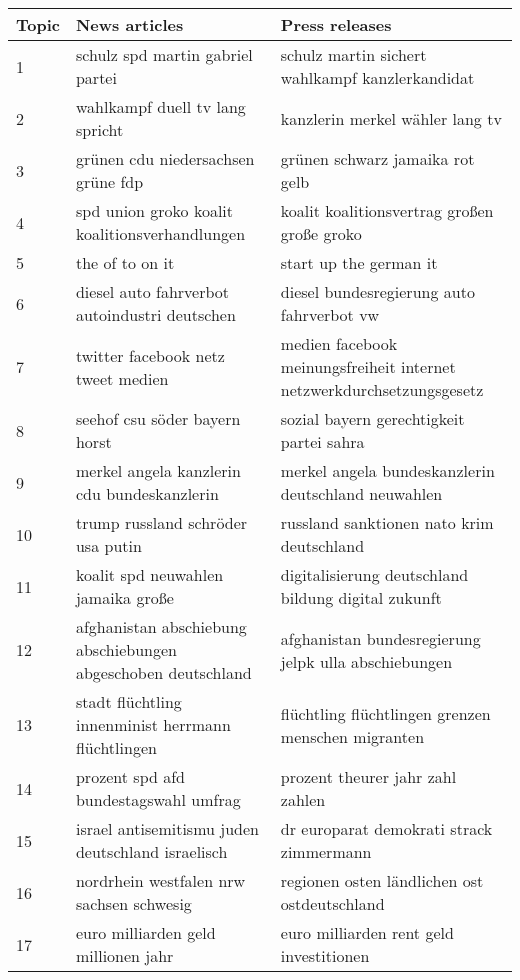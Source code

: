 \begin{table}[ht]
\centering
\begin{tabular}{lll}
  \hline
Topic & News articles & Press releases \\ 
  \hline
1 & schulz spd martin gabriel partei & schulz martin sichert wahlkampf kanzlerkandidat \\ 
  2 & wahlkampf duell tv lang spricht & kanzlerin merkel wähler lang tv \\ 
  3 & grünen cdu niedersachsen grüne fdp & grünen schwarz jamaika rot gelb \\ 
  4 & spd union groko koalit koalitionsverhandlungen & koalit koalitionsvertrag großen große groko \\ 
  5 & the of to on it & start up the german it \\ 
  6 & diesel auto fahrverbot autoindustri deutschen & diesel bundesregierung auto fahrverbot vw \\ 
  7 & twitter facebook netz tweet medien & medien facebook meinungsfreiheit internet netzwerkdurchsetzungsgesetz \\ 
  8 & seehof csu söder bayern horst & sozial bayern gerechtigkeit partei sahra \\ 
  9 & merkel angela kanzlerin cdu bundeskanzlerin & merkel angela bundeskanzlerin deutschland neuwahlen \\ 
  10 & trump russland schröder usa putin & russland sanktionen nato krim deutschland \\ 
  11 & koalit spd neuwahlen jamaika große & digitalisierung deutschland bildung digital zukunft \\ 
  12 & afghanistan abschiebung abschiebungen abgeschoben deutschland & afghanistan bundesregierung jelpk ulla abschiebungen \\ 
  13 & stadt flüchtling innenminist herrmann flüchtlingen & flüchtling flüchtlingen grenzen menschen migranten \\ 
  14 & prozent spd afd bundestagswahl umfrag & prozent theurer jahr zahl zahlen \\ 
  15 & israel antisemitismu juden deutschland israelisch & dr europarat demokrati strack zimmermann \\ 
  16 & nordrhein westfalen nrw sachsen schwesig & regionen osten ländlichen ost ostdeutschland \\ 
  17 & euro milliarden geld millionen jahr & euro milliarden rent geld investitionen \\ 

\end{tabular}
\end{table}
